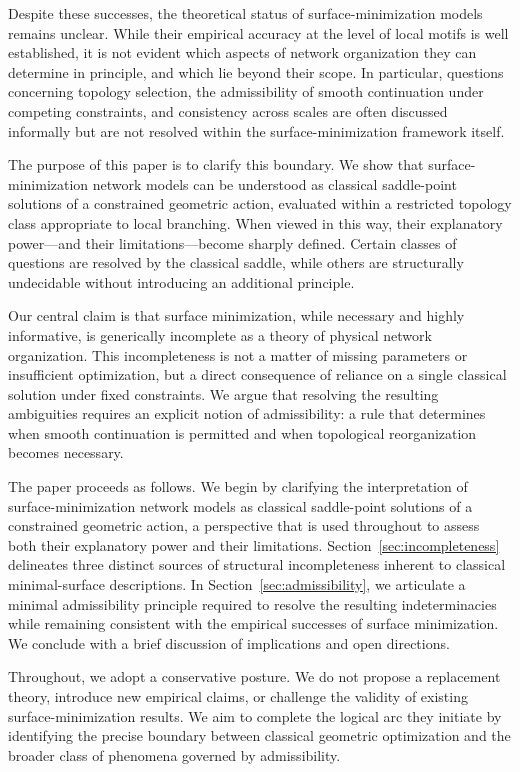 Despite these successes, the theoretical status of surface-minimization models remains unclear. While their empirical accuracy at the level of local motifs is well established, it is not evident which aspects of network organization they can determine in principle, and which lie beyond their scope. In particular, questions concerning topology selection, the admissibility of smooth continuation under competing constraints, and consistency across scales are often discussed informally but are not resolved within the surface-minimization framework itself.

The purpose of this paper is to clarify this boundary. We show that surface-minimization network models can be understood as classical saddle-point solutions of a constrained geometric action, evaluated within a restricted topology class appropriate to local branching. When viewed in this way, their explanatory power---and their limitations---become sharply defined. Certain classes of questions are resolved by the classical saddle, while others are structurally undecidable without introducing an additional principle.

Our central claim is that surface minimization, while necessary and highly informative, is generically incomplete as a theory of physical network organization. This incompleteness is not a matter of missing parameters or insufficient optimization, but a direct consequence of reliance on a single classical solution under fixed constraints. We argue that resolving the resulting ambiguities requires an explicit notion of admissibility: a rule that determines when smooth continuation is permitted and when topological reorganization becomes necessary.

The paper proceeds as follows. We begin by clarifying the interpretation of surface-minimization network models as classical saddle-point solutions of a constrained geometric action, a perspective that is used throughout to assess both their explanatory power and their limitations. Section~\ref{sec:incompleteness} delineates three distinct sources of structural incompleteness inherent to classical minimal-surface descriptions. In Section~\ref{sec:admissibility}, we articulate a minimal admissibility principle required to resolve the resulting indeterminacies while remaining consistent with the empirical successes of surface minimization. We conclude with a brief discussion of implications and open directions.

Throughout, we adopt a conservative posture. We do not propose a replacement theory, introduce new empirical claims, or challenge the validity of existing surface-minimization results. We aim to complete the logical arc they initiate by identifying the precise boundary between classical geometric optimization and the broader class of phenomena governed by admissibility.

